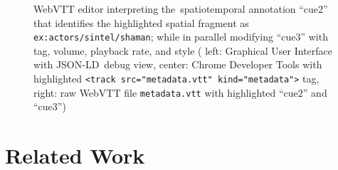 \documentclass{sig-alternate}
\def\JSONLD{\mbox{JSON-LD}}
\begin{document}
\begin{figure}[hbt]
  \centering
  \caption{WebVTT editor interpreting the~spatiotemporal annotation ``cue2''
    that identifies the highlighted spatial fragment as \texttt{ex:actors/sintel/shaman};
    while in parallel modifying ``cue3'' with tag, volume, playback rate,
    and style ( left: Graphical User Interface with \JSONLD\ debug view,
   center: Chrome Developer Tools with highlighted
  \texttt{<track src="metadata.vtt" kind="metadata">} tag,
   right: raw WebVTT file \texttt{metadata.vtt} with highlighted ``cue2'' and ``cue3'')}
  \label{fig:webvtt-editor}
\end{figure}

\section{Related Work}
\label{sec:related-work}
\end{document}
